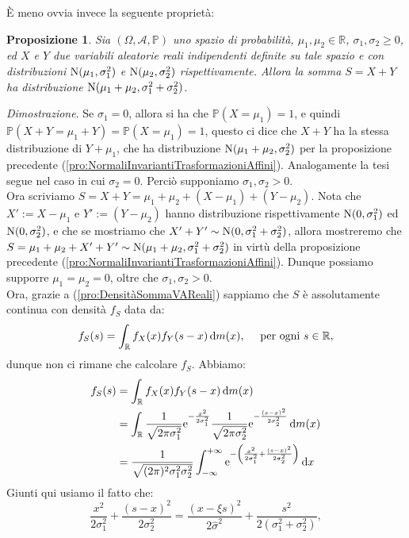 \documentclass[11pt]{book}
\makeatletter
\theoremstyle{Definizione}
\theoremstyle{TeoremaProposizioneLemmaCorollario}
\newtheorem{mypropo}[myteo]{Proposizione}
\theoremstyle{OsservazioneNota}
\renewenvironment{proof}[1][\proofname]{\par
  \normalfont \topsep6\p@\@plus6\p@\relax
  \trivlist
  \item[\hskip\labelsep
        \itshape
    #1\@addpunct{.}]\ignorespaces
}{%
  \endtrivlist\@endpefalse
}
\newcommand{\R}{\mathbb{R}}
\renewcommand{\P}{\mathbb{P}}
\renewcommand{\d}{\mathrm{d}}
\newcommand{\e}{\textup{e}}
\renewenvironment{proof}{\textsl{Dimostrazione}.}{}
\makeatother
\begin{document}
\noindent
È meno ovvia invece la seguente proprietà:
\begin{boxpro}
\begin{mypropo}
Sia $(\Omega,\mathcal{A},\P)$ uno spazio di probabilità, $\mu_1,\mu_2\in \R$, $\sigma_1,\sigma_2\geq 0$, ed $X$ e $Y$ due variabili aleatorie reali indipendenti definite su tale spazio e con distribuzioni $\textup{N}(\mu_1,\sigma_1^2)$ e $\textup{N}(\mu_2,\sigma_2^2)$ rispettivamente. Allora la somma $S = X+Y$ ha distribuzione $\textup{N}(\mu_1+\mu_2,\sigma_1^2+\sigma_2^2)$.
\end{mypropo}
\tcblower
\begin{proof}
Se $\sigma_1 = 0$, allora si ha che $\P(X = \mu_1) = 1$, e quindi $\P(X+Y = \mu_1+Y) = \P(X = \mu_1) = 1$, questo ci dice che $X+Y$ ha la stessa distribuzione di $Y+\mu_1$, che ha distribuzione $\textup{N}(\mu_1+\mu_2,\sigma_2^2)$ per la proposizione precedente (\ref{pro:NormaliInvariantiTrasformazioniAffini}). Analogamente la tesi segue nel caso in cui $\sigma_2 = 0$. Perciò supponiamo $\sigma_1,\sigma_2 > 0$.\\
Ora scriviamo $S = X+Y = \mu_1+\mu_2 + (X-\mu_1)+ (Y-\mu_2)$. Nota che $X' := X-\mu_1$ e $Y' := (Y-\mu_2)$ hanno distribuzione rispettivamente $\textup{N}(0,\sigma_1^2)$ ed $\textup{N}(0,\sigma_2^2)$, e che se mostriamo che $X'+Y'\sim \textup{N}(0,\sigma_1^2+\sigma_2^2)$, allora mostreremo che $S = \mu_1+\mu_2 + X'+Y' \sim \textup{N}(\mu_1+\mu_2,\sigma_1^2+\sigma_2^2)$ in virtù della proposizione precedente (\ref{pro:NormaliInvariantiTrasformazioniAffini}). Dunque possiamo supporre $\mu_1 = \mu_2 = 0$, oltre che $\sigma_1,\sigma_2 > 0$.\\
Ora, grazie a (\ref{pro:DensitàSommaVAReali}) sappiamo che $S$ è assolutamente continua con densità $f_S$ data da:
$$
f_S(s) = \int_\R f_X(x)f_Y(s-x)\,\d m(x),\quad \textup{ per ogni }s\in \R,
$$
dunque non ci rimane che calcolare $f_S$. Abbiamo:
\begin{align*}
f_S(s) &= \int_\R f_X(x)f_Y(s-x) \,\d m(x) \\
&= \int_\R \frac{1}{\sqrt{2\pi\sigma_1^2}}\e^{-\frac{x^2}{2\sigma_1^2}}\frac{1}{\sqrt{2\pi\sigma_2^2}}\e^{-\frac{(s-x)^2}{2\sigma_2^2}} \, \d m (x)\\
&= \frac{1}{\sqrt{(2\pi)^2\sigma_1^2\sigma_2^2}}\int_{-\infty}^{+\infty} \e^{-\left(\frac{x^2}{2\sigma_1^2}+\frac{(s-x)^2}{2\sigma_2^2}\right)}\,\d x
\end{align*}
Giunti qui usiamo il fatto che:
$$
\frac{x^2}{2\sigma_1^2}+\frac{(s-x)^2}{2\sigma_2^2} = \frac{(x-\xi s)^2}{2\hat{\sigma}^2}+\frac{s^2}{2(\sigma_1^2+\sigma_2^2)},
$$
\end{proof}
\end{boxpro}
\end{document}
